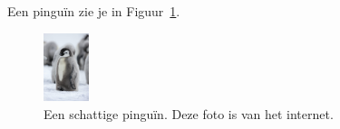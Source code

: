 \documentclass[../presentatie.tex]{subfiles}
\begin{document}
\begin{frame}{}
	\vspace{-28px}
	
	\begin{penExResult}[3cm]
		Een pinguïn zie je in Figuur~\ref{fig:pinguin}.
		\begin{figure}[h!]
			\centering
			\includegraphics[height=2cm]{pinguin.jpg}
			\caption{Een schattige pinguïn. Deze foto is van het internet.}\label{fig:pinguin}
		\end{figure}
	\end{penExResult}
\end{frame}
\end{document}
